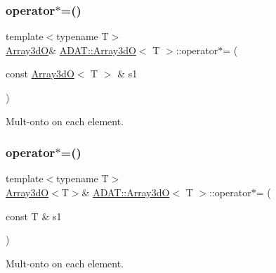 \subsubsection{\texorpdfstring{operator$\ast$=()}{operator*=()}\hspace{0.1cm}{\footnotesize\ttfamily [2/4]}}
{\footnotesize\ttfamily template$<$typename T$>$ \\
\mbox{\hyperlink{classADAT_1_1Array3dO}{Array3dO}}\& \mbox{\hyperlink{classADAT_1_1Array3dO}{A\+D\+A\+T\+::\+Array3dO}}$<$ T $>$\+::operator$\ast$= (\begin{DoxyParamCaption}\item[{const \mbox{\hyperlink{classADAT_1_1Array3dO}{Array3dO}}$<$ T $>$ \&}]{s1 }\end{DoxyParamCaption})\hspace{0.3cm}{\ttfamily [inline]}}



Mult-\/onto on each element. 

\mbox{\label{classADAT_1_1Array3dO_acec17a674874030d454e516aad24f8a8}} 
\subsubsection{\texorpdfstring{operator$\ast$=()}{operator*=()}\hspace{0.1cm}{\footnotesize\ttfamily [3/4]}}
{\footnotesize\ttfamily template$<$typename T$>$ \\
\mbox{\hyperlink{classADAT_1_1Array3dO}{Array3dO}}$<$T$>$\& \mbox{\hyperlink{classADAT_1_1Array3dO}{A\+D\+A\+T\+::\+Array3dO}}$<$ T $>$\+::operator$\ast$= (\begin{DoxyParamCaption}\item[{const T \&}]{s1 }\end{DoxyParamCaption})\hspace{0.3cm}{\ttfamily [inline]}}



Mult-\/onto on each element. 

\mbox{\label{classADAT_1_1Array3dO_acec17a674874030d454e516aad24f8a8}} 

